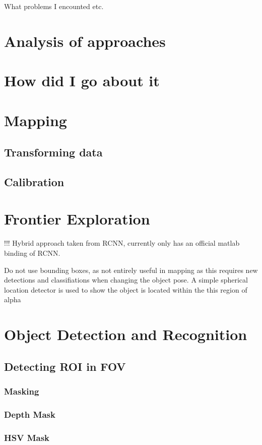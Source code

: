 \documentclass{mproj}
\begin{document}
What problems I encounted etc.

\section{Analysis of approaches}
\section{How did I go about it}

\section{Mapping}
\subsection{Transforming data}
\subsection{Calibration}

\section{Frontier Exploration} !!!
Hybrid approach taken from RCNN, currently only has an official matlab binding of RCNN.

Do not use bounding boxes, as not entirely useful in mapping as this requires new detections and classifiations when changing the object pose. A simple spherical location detector is used to show the object is located within the this region of alpha

\section{Object Detection and Recognition}
\subsection{Detecting ROI in FOV}
\subsubsection{Masking}
\subsubsection{Depth Mask}
\subsubsection{HSV Mask}
\end{document}
